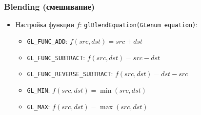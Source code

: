 \documentclass{beamer}
\begin{document}
\begin{frame}[fragile]
\frametitle{Blending (смешивание)}
\begin{itemize}
\item Настройка функции \begin{math}f\end{math}: \verb|glBlendEquation(GLenum equation)|:
\pause
\begin{itemize}
\item \verb|GL_FUNC_ADD|: \begin{math}f(src, dst) = src + dst\end{math}
\item \verb|GL_FUNC_SUBTRACT|: \begin{math}f(src, dst) = src - dst\end{math}
\item \verb|GL_FUNC_REVERSE_SUBTRACT|: \begin{math}f(src, dst) = dst - src\end{math}
\item \verb|GL_MIN|: \begin{math}f(src, dst) = \min(src, dst)\end{math}
\item \verb|GL_MAX|: \begin{math}f(src, dst) = \max(src, dst)\end{math}
\end{itemize}
\end{itemize}
\end{frame}
\end{document}
